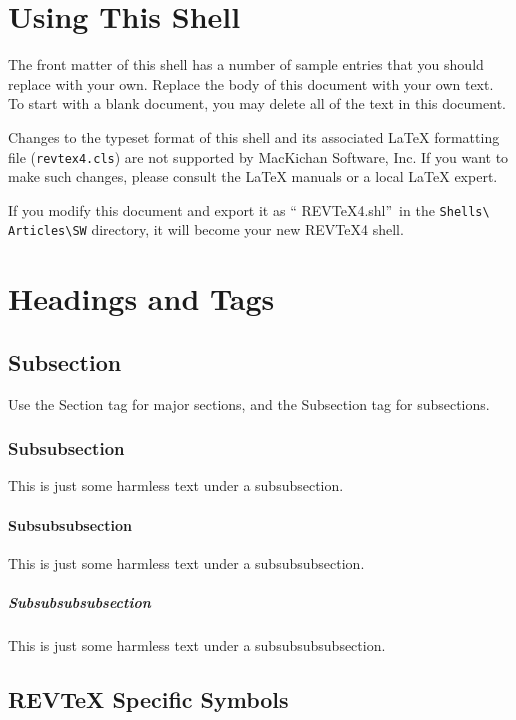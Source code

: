 \documentclass[aps,preprint]{revtex4}%
\begin{document}
\section{Using This Shell}

The front matter of this shell has a number of sample entries that you should
replace with your own. Replace the body of this document with your own text.
To start with a blank document, you may delete all of the text in this document.

Changes to the typeset format of this shell and its associated \LaTeX{}
formatting file (\texttt{revtex4.cls}) are not supported by MacKichan
Software, Inc. If you want to make such changes, please consult the \LaTeX{}
manuals or a local \LaTeX{} expert.

If you modify this document and export it as \textquotedblleft
REVTeX4.shl\textquotedblright\ in the \texttt{Shells\textbackslash
Articles\textbackslash SW} directory, it will become your new REVTeX4 shell.

\section{Headings and Tags}

\subsection{Subsection}

Use the Section tag for major sections, and the Subsection tag for subsections.

\subsubsection{Subsubsection}

This is just some harmless text under a subsubsection.

\paragraph{Subsubsubsection}

This is just some harmless text under a subsubsubsection.

\subparagraph{Subsubsubsubsection}

This is just some harmless text under a subsubsubsubsection.

\subsection{REV\TeX{} Specific Symbols}
\end{document}
